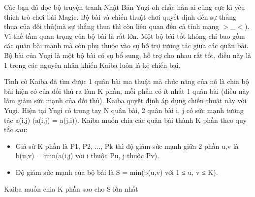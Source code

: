Các bạn đã đọc bộ truyện tranh Nhật Bản Yugi-oh chắc hẳn ai cũng cực kì yêu thích trò chơi bài Magic. Bộ bài và chiến thuật chơi quyết định đến sự thắng thua của đối thủ(mà sự thắng thua thì còn liên quan đến cả tính mạng $>$\_$<$). Vì thế tầm quan trọng của bộ bài là rất lớn. Một bộ bài tốt không chỉ bao gồm các quân bài mạnh mà còn phụ thuộc vào sự hỗ trợ tương tác giữa các quân bài. Bộ bài của Yugi là một bộ bài có sự bổ sung, hỗ trợ cho nhau rất tốt, điều này là 1 trong các nguyên nhân khiến Kaiba luôn là kẻ chiến bại.  

   Tình cờ Kaiba đã tìm được 1 quân bài ma thuật mà chức năng của nó là chia bộ bài hiện có của đối thủ ra làm K phần, mỗi phần có ít nhất 1 quân bài (điều này làm giảm sức mạnh của đối thủ). Kaiba quyết định áp dụng chiến thuật này với Yugi. Hiện tại Yugi có trong tay N quân bài, 2 quân bài i, j có sức mạnh tương tác a(i,j) (a(i,j) = a(j,i)). Kaiba muốn chia các quân bài thành K phần theo quy tắc sau:  
\begin{itemize}
	\item     Giả sử K phần là P1, P2, ..., Pk thì độ giảm sức mạnh giữa 2 phần u,v là b(u,v) = min(a(i,j) với i thuộc Pu, j thuộc Pv).   
	\item     Độ giảm sức mạnh của bộ bài là S = min(b(u,v) với 1 ≤ u, v ≤ K).   
\end{itemize}

   Kaiba muốn chia K phần sao cho S lớn nhất  

\